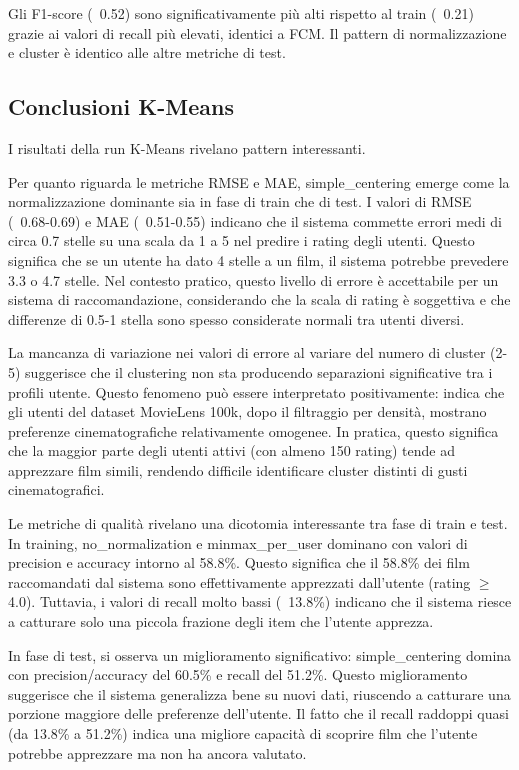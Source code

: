 Gli F1-score (~0.52) sono significativamente più alti rispetto al train (~0.21) grazie ai valori di recall più elevati, identici a FCM. Il pattern di normalizzazione e cluster è identico alle altre metriche di test.

\subsection{Conclusioni K-Means}

I risultati della run K-Means rivelano pattern interessanti.

Per quanto riguarda le metriche RMSE e MAE, simple\_centering emerge come la normalizzazione dominante sia in fase di train che di test. I valori di RMSE (~0.68-0.69) e MAE (~0.51-0.55) indicano che il sistema commette errori medi di circa 0.7 stelle su una scala da 1 a 5 nel predire i rating degli utenti. Questo significa che se un utente ha dato 4 stelle a un film, il sistema potrebbe prevedere 3.3 o 4.7 stelle. Nel contesto pratico, questo livello di errore è accettabile per un sistema di raccomandazione, considerando che la scala di rating è soggettiva e che differenze di 0.5-1 stella sono spesso considerate normali tra utenti diversi.

La mancanza di variazione nei valori di errore al variare del numero di cluster (2-5) suggerisce che il clustering non sta producendo separazioni significative tra i profili utente. Questo fenomeno può essere interpretato positivamente: indica che gli utenti del dataset MovieLens 100k, dopo il filtraggio per densità, mostrano preferenze cinematografiche relativamente omogenee. In pratica, questo significa che la maggior parte degli utenti attivi (con almeno 150 rating) tende ad apprezzare film simili, rendendo difficile identificare cluster distinti di gusti cinematografici.

Le metriche di qualità rivelano una dicotomia interessante tra fase di train e test. In training, no\_normalization e minmax\_per\_user dominano con valori di precision e accuracy intorno al 58.8\%. Questo significa che il 58.8\% dei film raccomandati dal sistema sono effettivamente apprezzati dall'utente (rating $\geq$ 4.0). Tuttavia, i valori di recall molto bassi (~13.8\%) indicano che il sistema riesce a catturare solo una piccola frazione degli item che l'utente apprezza.

In fase di test, si osserva un miglioramento significativo: simple\_centering domina con precision/accuracy del 60.5\% e recall del 51.2\%. Questo miglioramento suggerisce che il sistema generalizza bene su nuovi dati, riuscendo a catturare una porzione maggiore delle preferenze dell'utente. Il fatto che il recall raddoppi quasi (da 13.8\% a 51.2\%) indica una migliore capacità di scoprire film che l'utente potrebbe apprezzare ma non ha ancora valutato.

